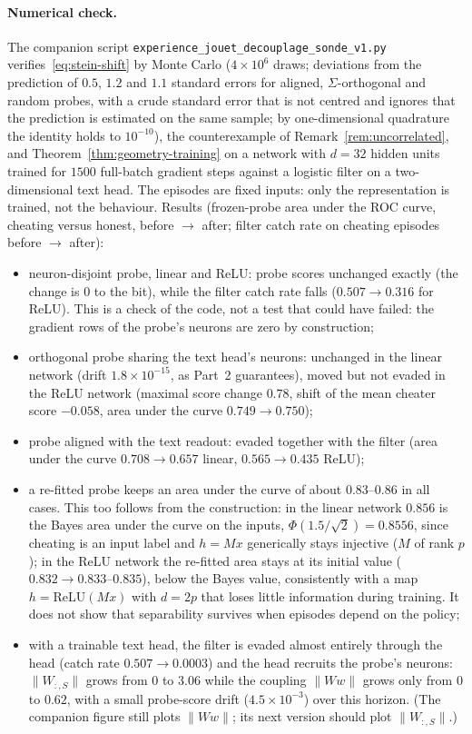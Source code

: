 \paragraph{Numerical check.} The companion script \texttt{experience\_jouet\_decouplage\_sonde\_v1.py} verifies~\eqref{eq:stein-shift} by Monte Carlo ($4 \times 10^6$ draws; deviations from the prediction of $0.5$, $1.2$ and $1.1$ standard errors for aligned, $\Sigma$-orthogonal and random probes, with a crude standard error that is not centred and ignores that the prediction is estimated on the same sample; by one-dimensional quadrature the identity holds to $10^{-10}$), the counterexample of Remark~\ref{rem:uncorrelated}, and Theorem~\ref{thm:geometry-training} on a network with $d = 32$ hidden units trained for $1500$ full-batch gradient steps against a logistic filter on a two-dimensional text head. The episodes are fixed inputs: only the representation is trained, not the behaviour. Results (frozen-probe area under the ROC curve, cheating versus honest, before $\to$ after; filter catch rate on cheating episodes before $\to$ after):
\begin{itemize}
  \item neuron-disjoint probe, linear and ReLU: probe scores unchanged exactly (the change is $0$ to the bit), while the filter catch rate falls ($0.507 \to 0.316$ for ReLU). This is a check of the code, not a test that could have failed: the gradient rows of the probe's neurons are zero by construction;
  \item orthogonal probe sharing the text head's neurons: unchanged in the linear network (drift $1.8 \times 10^{-15}$, as Part~2 guarantees), moved but not evaded in the ReLU network (maximal score change $0.78$, shift of the mean cheater score $-0.058$, area under the curve $0.749 \to 0.750$);
  \item probe aligned with the text readout: evaded together with the filter (area under the curve $0.708 \to 0.657$ linear, $0.565 \to 0.435$ ReLU);
  \item a re-fitted probe keeps an area under the curve of about $0.83$--$0.86$ in all cases. This too follows from the construction: in the linear network $0.856$ is the Bayes area under the curve on the inputs, $\Phi(1.5/\sqrt{2}) = 0.8556$, since cheating is an input label and $h = Mx$ generically stays injective ($M$ of rank $p$); in the ReLU network the re-fitted area stays at its initial value ($0.832 \to 0.833$--$0.835$), below the Bayes value, consistently with a map $h = \mathrm{ReLU}(Mx)$ with $d = 2p$ that loses little information during training. It does not show that separability survives when episodes depend on the policy;
  \item with a trainable text head, the filter is evaded almost entirely through the head (catch rate $0.507 \to 0.0003$) and the head recruits the probe's neurons: $\|W_{:,S}\|$ grows from $0$ to $3.06$ while the coupling $\|Ww\|$ grows only from $0$ to $0.62$, with a small probe-score drift ($4.5 \times 10^{-3}$) over this horizon. (The companion figure still plots $\|Ww\|$; its next version should plot $\|W_{:,S}\|$.)
\end{itemize}
